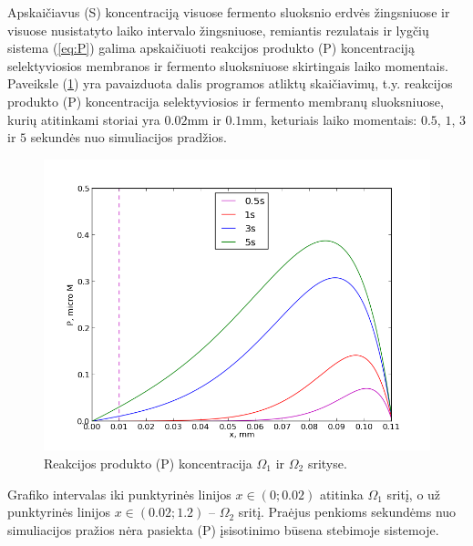 \documentclass[12pt, a4paper, lithuanian]{article}
\begin{document}
Apskaičiavus (S) koncentraciją visuose fermento sluoksnio erdvės žingsniuose ir
visuose nusistatyto laiko intervalo žingsniuose, remiantis rezulatais ir lygčių
sistema (\ref{eq:P}) galima apskaičiuoti reakcijos produkto (P) koncentraciją
selektyviosios membranos ir fermento sluoksniuose skirtingais laiko momentais.
Paveiksle (\ref{img:P}) yra pavaizduota dalis programos atliktų skaičiavimų,
t.y. reakcijos produkto (P) koncentracija selektyviosios ir
fermento membranų sluoksniuose, kurių atitinkami storiai yra $0.02$mm ir $0.1$mm, keturiais laiko momentais: $0.5$, $1$,
$3$ ir $5$ sekundės nuo simuliacijos pradžios.
 \begin{figure}[H]
     \centering
     \includegraphics[scale=0.5]{img/kurP}
     \caption{Reakcijos produkto (P) koncentracija $\Omega_1$ ir $\Omega_2$
     srityse.}
     \label{img:P}
 \end{figure}
 
 Grafiko intervalas iki punktyrinės linijos $x\in(0 ;0.02)$ atitinka $\Omega_1$
 sritį, o už punktyrinės linijos $x\in(0.02;1.2)$ – $\Omega_2$ sritį. Praėjus penkioms sekundėms nuo simuliacijos pražios
 nėra pasiekta (P) įsisotinimo būsena stebimoje sistemoje.
 
\end{document}
